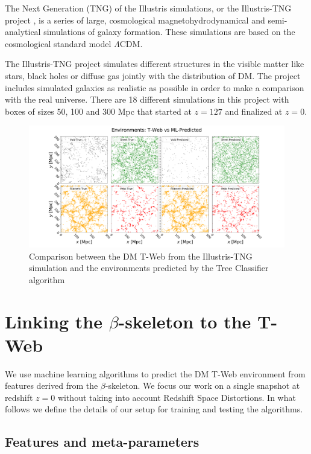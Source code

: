 \documentclass[usenatbib]{mnras}
\begin{document}
The Next Generation (TNG) of the Illustris simulations, or the Illustris-TNG project \citep{Nelson2015}, 
is a series of large, cosmological magnetohydrodynamical and semi-analytical simulations of
galaxy formation. These simulations are based on the cosmological standard model $\Lambda$CDM.

The Illustris-TNG project simulates different structures in the visible matter like stars, black
holes or diffuse gas jointly with the distribution of DM. 
The project includes simulated galaxies as realistic as possible in order to make a comparison
with the real universe.
There are 18 different simulations in this project with boxes of sizes 50, 100 and 300 Mpc
that started at  $z=127$ and finalized at $z=0$. 

\begin{figure}
  \centering 
    \includegraphics[scale=0.3]{Figs/p_environment_predicted.pdf}
    \caption{Comparison between the DM T-Web from the Illustris-TNG simulation and the environments predicted by the Tree Classifier algorithm}
    \label{fig:prediction}
\end{figure}

\section{Linking the $\beta$-skeleton to the T-Web}\label{sec:link}

We use machine learning algorithms to predict the DM T-Web environment from features derived from the $\beta$-skeleton.
We focus our work on a single snapshot at redshift $z=0$ without taking into
account Redshift Space Distortions.
In what follows we define the details of our setup for training and testing the algorithms.


\subsection{Features and meta-parameters}
\end{document}
